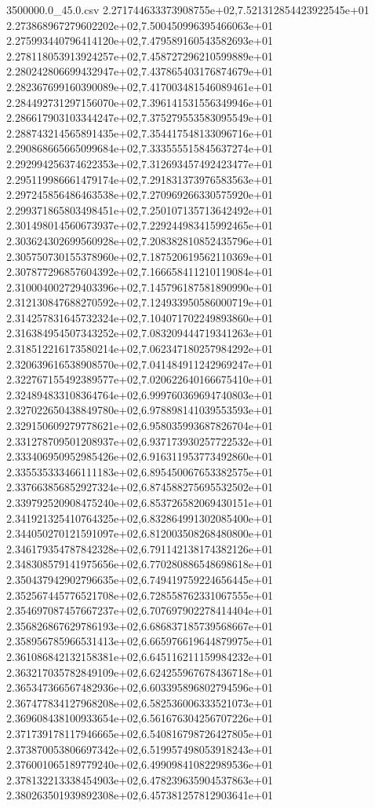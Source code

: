 \begin{filecontents*}{3500000.0_45.0.csv}
2.271744633373908755e+02,7.521312854423922545e+01
2.273868967279602202e+02,7.500450996395466063e+01
2.275993440796414120e+02,7.479589160543582693e+01
2.278118053913924257e+02,7.458727296210599889e+01
2.280242806699432947e+02,7.437865403176874679e+01
2.282367699160390089e+02,7.417003481546089461e+01
2.284492731297156070e+02,7.396141531556349946e+01
2.286617903103344247e+02,7.375279553583095549e+01
2.288743214565891435e+02,7.354417548133096716e+01
2.290868665665099684e+02,7.333555515845637274e+01
2.292994256374622353e+02,7.312693457492423477e+01
2.295119986661479174e+02,7.291831373976583563e+01
2.297245856486463538e+02,7.270969266330575920e+01
2.299371865803498451e+02,7.250107135713642492e+01
2.301498014560673937e+02,7.229244983415992465e+01
2.303624302699560928e+02,7.208382810852435796e+01
2.305750730155378960e+02,7.187520619562110369e+01
2.307877296857604392e+02,7.166658411210119084e+01
2.310004002729403396e+02,7.145796187581890990e+01
2.312130847688270592e+02,7.124933950586000719e+01
2.314257831645732324e+02,7.104071702249893860e+01
2.316384954507343252e+02,7.083209444719341263e+01
2.318512216173580214e+02,7.062347180257984292e+01
2.320639616538908570e+02,7.041484911242969247e+01
2.322767155492389577e+02,7.020622640166675410e+01
2.324894833108364764e+02,6.999760369694740803e+01
2.327022650438849780e+02,6.978898141039553593e+01
2.329150609279778621e+02,6.958035993687826704e+01
2.331278709501208937e+02,6.937173930257722532e+01
2.333406950952985426e+02,6.916311953773492860e+01
2.335535333466111183e+02,6.895450067653382575e+01
2.337663856852927324e+02,6.874588275695532502e+01
2.339792520908475240e+02,6.853726582069430151e+01
2.341921325410764325e+02,6.832864991302085400e+01
2.344050270121591097e+02,6.812003508268480800e+01
2.346179354787842328e+02,6.791142138174382126e+01
2.348308579141975656e+02,6.770280886548698618e+01
2.350437942902796635e+02,6.749419759224656445e+01
2.352567445776521708e+02,6.728558762331067555e+01
2.354697087457667237e+02,6.707697902278414404e+01
2.356826867629786193e+02,6.686837185739568667e+01
2.358956785966531413e+02,6.665976619644879975e+01
2.361086842132158381e+02,6.645116211159984232e+01
2.363217035782849109e+02,6.624255967678436718e+01
2.365347366567482936e+02,6.603395896802794596e+01
2.367477834127968208e+02,6.582536006333521073e+01
2.369608438100933654e+02,6.561676304256707226e+01
2.371739178117946665e+02,6.540816798726427805e+01
2.373870053806697342e+02,6.519957498053918243e+01
2.376001065189779240e+02,6.499098410822989536e+01
2.378132213338454903e+02,6.478239635904537863e+01
2.380263501939892308e+02,6.457381257812903641e+01

\end{filecontents*}
